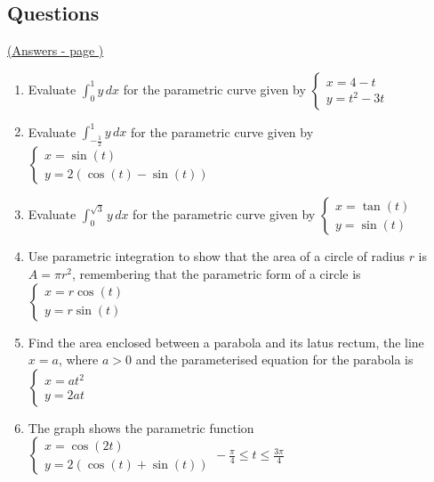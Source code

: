 \documentclass[../main.tex]{subfiles}
\begin{document}
\pagebreak
\hypertarget{parametricintegrationlink}{\subsection*{Questions}}
\hyperlink{parametricintegrationanswers}{(Answers - page {\pageref*{Parametric integration answers}})}

\label{parametric integration}
\begin{enumerate}[itemsep=1cm]
    \item 
    Evaluate $\int_0^1 y\,dx$ for the parametric curve given by $\begin{cases} x=4-t \\ y=t^2-3t \end{cases}$

    \item 
    Evaluate $\int_{-\frac{1}{2}}^1 y\,dx$ for the parametric curve given by $\begin{cases} x=\sin{(t)} \\ y=2(\cos{(t)}-\sin{(t)}) \end{cases}$

    \item 
    Evaluate $\int_0^{\sqrt{3}}y\,dx$ for the parametric curve given by $\begin{cases} x=\tan{(t)} \\ y=\sin{(t)} \end{cases}$

    \item 
    Use parametric integration to show that the area of a circle of radius $r$ is $A=\pi r^2$, remembering that the parametric form of a circle is $\begin{cases} x=r\cos{(t)} \\ y=r\sin{(t)} \end{cases}$

    \item 
    Find the area enclosed between a parabola and its latus rectum, the line $x=a$, where $a>0$ and the parameterised equation for the parabola is $\begin{cases} x=at^2 \\ y=2at \end{cases}$

    \item 
    The graph shows the parametric function $\begin{cases} x=\cos{(2t)} \\ y=2(\cos{(t)}+\sin{(t)}) \end{cases} -\frac{\pi}{4}\leq t \leq \frac{3\pi}{4}$


\end{enumerate}
\end{document}

